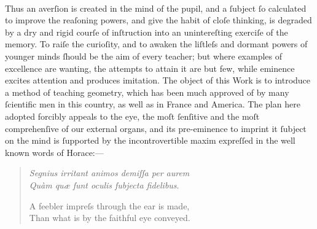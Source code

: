 \hfill\\
Thus an averſion is created in the mind of the pupil, and a ſubject ſo calculated to improve the reaſoning powers, and give the habit of cloſe thinking, is degraded by a dry and rigid courſe of inſtruction into an unintereſting exerciſe of the memory. To raiſe the curioſity, and to awaken the liſtleſs and dormant powers of younger minds ſhould be the aim of every teacher; but where examples of excellence are wanting, the attempts to attain it are but few, while eminence excites attention and produces imitation. The object of this Work is to introduce a method of teaching geometry, which has been much approved of by many ſcientific men in this country, as well as in France and America. The plan here adopted forcibly appeals to the eye, the moſt ſenſitive and the moſt comprehenſive of our external organs, and its pre-eminence to imprint it ſubject on the mind is ſupported by the incontrovertible maxim expreſſed in the well known words of Horace:—
\begin{quotation}
    \noindent \small{\textit{Segnius irritant animos demiſſa per aurem\\
            Quàm quæ ſunt oculis ſubjecta fidelibus}}.

    \noindent \small{A feebler impreſs through the ear is made,\\
        Than what is by the faithful eye conveyed}.
\end{quotation}
\vspace{1ex}

